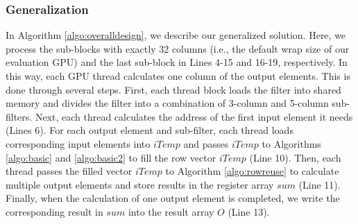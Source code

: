\subsubsection{Generalization} In Algorithm \ref{algo:overalldesign}, we describe our generalized solution. Here, we process the sub-blocks
with exactly 32 columns (i.e., the default wrap size of our evaluation GPU) and the last sub-block in Lines 4-15 and 16-19, respectively.
In this way, each GPU thread calculates one column of the output elements. This is done through several steps. First, each thread block
loads the filter into shared memory and divides the filter into a combination of 3-column and 5-column sub-filters. Next, each thread
calculates the address of the first input element it needs (Lines 6). For each output element and sub-filter, each thread loads
corresponding input elements into $iTemp$ and passes $iTemp$ to Algorithms \ref{algo:basic} and \ref{algo:basic2} to fill the row vector $iTemp$
(Line 10). Then, each thread passes the filled vector $iTemp$ to Algorithm \ref{algo:rowreuse} to calculate multiple output elements and
store results in the register array $sum$ (Line 11). Finally, when the calculation of one output element is completed, we write the
corresponding result in $sum$ into the result array $O$ (Line 13).

